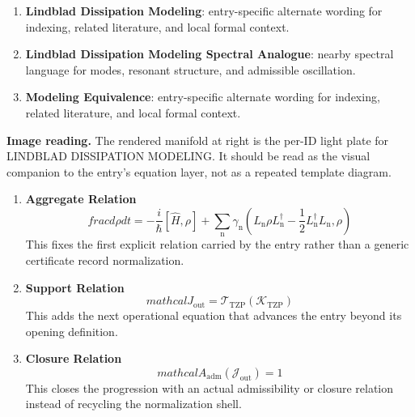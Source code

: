 \begin{enumerate}[leftmargin=1.6em,itemsep=6pt,topsep=4pt]
\item \textbf{Lindblad Dissipation Modeling}: entry-specific alternate wording for indexing, related literature, and local formal context.
\item \textbf{Lindblad Dissipation Modeling Spectral Analogue}: nearby spectral language for modes, resonant structure, and admissible oscillation.
\item \textbf{Modeling Equivalence}: entry-specific alternate wording for indexing, related literature, and local formal context.
\end{enumerate}

\begin{samepage}
\noindent\begin{minipage}[t]{0.45\linewidth}
\vspace{0pt}
\raggedright
\scriptsize\textbf{Image reading.} The rendered manifold at right is the per-ID light plate for LINDBLAD DISSIPATION MODELING. It should be read as the visual companion to the entry's equation layer, not as a repeated template diagram.\par
\end{minipage}\hfill
\begin{minipage}[t]{0.53\linewidth}
\vspace*{-0.10in}
\raggedright
{}
\end{minipage}
\end{samepage}

\clearpage


\begin{enumerate}[leftmargin=1.6em,itemsep=9pt,topsep=6pt]
\item \textbf{Aggregate Relation}
\[
frac{d\rho}{dt} = -\frac{i}{\hbar}[\hat{H}, \rho] + \sum_{\mathrm{n}} \gamma_{\mathrm{n}} \left( L_{\mathrm{n}} \rho L_{\mathrm{n}}^\dagger - \frac{1}{2} { L_{\mathrm{n}}^\dagger L_{\mathrm{n}}, \rho } \right)
\]
This fixes the first explicit relation carried by the entry rather than a generic certificate record normalization.

\item \textbf{Support Relation}
\[
mathcal{J}_{\mathrm{out}} = \mathcal{T}_{\mathrm{TZP}}\!\left(\mathcal{K}_{\mathrm{TZP}}\right)
\]
This adds the next operational equation that advances the entry beyond its opening definition.

\item \textbf{Closure Relation}
\[
mathcal{A}_{\mathrm{adm}}\!\left(\mathcal{J}_{\mathrm{out}}\right)=1
\]
This closes the progression with an actual admissibility or closure relation instead of recycling the normalization shell.
\end{enumerate}

